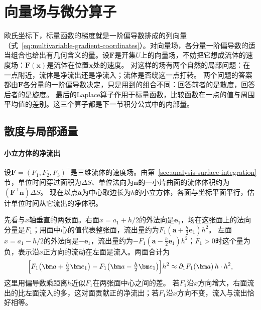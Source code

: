 \section{向量场与微分算子}

欧氏坐标下，标量函数的梯度就是一阶偏导数排成的列向量（式~\eqref{eq:multivariable-gradient-coordinates}）。对向量场，各分量一阶偏导数的适当组合也给出有几何含义的量。设$\bm F$是开集$U$上的向量场，不妨把它想成流体的速度场：$\bm F(\bm x)$是流体在位置$\bm x$处的速度。
对这样的场有两个自然的局部问题：在一点附近，流体是净流出还是净流入；流体是否绕这一点打转。
两个问题的答案都由$\bm F$各分量的一阶偏导数决定，只是用到的组合不同：回答前者的是散度，回答后者的是旋度。
最后的Laplace算子作用于标量函数，比较函数在一点的值与周围平均值的差别。这三个算子都是下一节积分公式中的内部量。

\subsection{散度与局部通量}

\paragraph{小立方体的净流出}

设$\bm F=(F_1,F_2,F_3)^\top$是三维流体的速度场。由第~\ref{sec:analysis-surface-integration}节，单位时间穿过面积为$\Delta S$、单位法向为$\bm n$的一小片曲面的流体体积约为$(\bm F^\top\bm n)\Delta S$。
现在以点$\bm a$为中心取边长为$h$的小立方体，各面与坐标平面平行，估计单位时间从它流出的净体积。

先看与$x$轴垂直的两张面。右面$x=a_1+h/2$的外法向是$\bm e_1$，场在这张面上的法向分量是$F_1$；用面中心的值代表整张面，流出量约为$F_1(\bm a+\tfrac h2\bm e_1)h^2$。
左面$x=a_1-h/2$的外法向是$-\bm e_1$，流出量约为$-F_1(\bm a-\tfrac h2\bm e_1)h^2$；$F_1>0$时这个量为负，表示沿$x$正方向的流动在左面是流入。两面合计为
\[
 \Bigl[F_1\bigl(\bm a+\tfrac h2\bm e_1\bigr)-F_1\bigl(\bm a-\tfrac h2\bm e_1\bigr)\Bigr]h^2
 \approx \partial_1F_1(\bm a)\,h\cdot h^2,
\]
这里用偏导数乘距离$h$近似$F_1$在两张面中心之间的差。
若$F_1$沿$x$方向增大，右面流出的比左面流入的多，这对面贡献正的净流出；若$F_1$沿$x$方向不变，流入与流出恰好相等。

